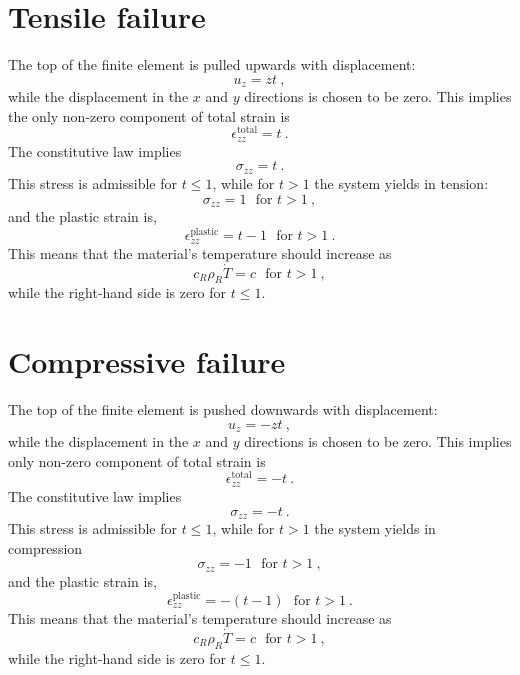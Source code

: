 \documentclass[]{scrreprt}
\begin{document}
\section{Tensile failure}

The top of the finite element is pulled upwards with displacement:
\begin{equation}
u_{z} = zt \ ,
\end{equation}
while the displacement in the $x$ and $y$ directions is chosen to be
zero.  This implies the only non-zero component of total strain is
\begin{equation}
\epsilon^{\mathrm{total}}_{zz} = t \ .
\end{equation}
The constitutive law implies
\begin{equation}
\sigma_{zz} = t \ .
\end{equation}
This stress is admissible for $t\leq 1$, while for $t>1$ the system
yields in tension:
\begin{equation}
\sigma_{zz} = 1 \ \ \ \mbox{for } t>1 \ ,
\end{equation}
and the plastic strain is,
\begin{equation}
\epsilon^{\mathrm{plastic}}_{zz} = t - 1 \ \ \ \mbox{for } t>1 \ .
\end{equation}
This means that the material's temperature should increase as
\begin{equation}
c_{R}\rho_{R}\dot{T} = c \ \ \ \mbox{for } t>1 \ ,
\end{equation}
while the right-hand side is zero for $t\leq 1$.

\section{Compressive failure}

The top of the finite element is pushed downwards with displacement:
\begin{equation}
u_{z} = -zt \ ,
\end{equation}
while the displacement in the $x$ and $y$ directions is chosen to be
zero.  This implies only non-zero component of total strain is
\begin{equation}
\epsilon^{\mathrm{total}}_{zz} = -t \ .
\end{equation}
The constitutive law implies
\begin{equation}
\sigma_{zz} = -t \ .
\end{equation}
This stress is admissible for $t\leq 1$, while for $t>1$ the system
yields in compression
\begin{equation}
\sigma_{zz} = -1 \ \ \ \mbox{for } t>1 \ ,
\end{equation}
and the plastic strain is,
\begin{equation}
\epsilon^{\mathrm{plastic}}_{zz} = -(t - 1) \ \ \ \mbox{for } t>1 \ .
\end{equation}
This means that the material's temperature should increase as
\begin{equation}
c_{R}\rho_{R}\dot{T} = c \ \ \ \mbox{for } t>1 \ ,
\end{equation}
while the right-hand side is zero for $t\leq 1$.
\end{document}
